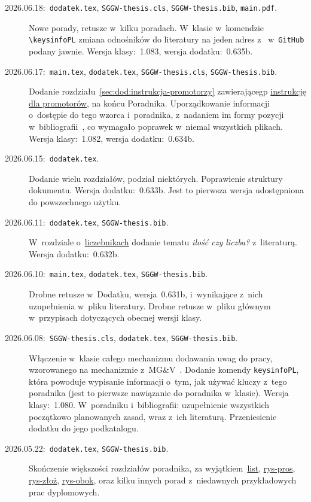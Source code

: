 \begin{description}
\item[\rm 2026.06.18:~{\tt dodatek.tex}, {\tt SGGW-thesis.cls}, {\tt SGGW-thesis.bib}, {\tt main.pdf}.] \mbox{}\linebreak Nowe porady, retusze w~kilku poradach. W~klasie w~komendzie \verb+\keysinfoPL+ zmiana odnośników do literatury na jeden adres z~ w~{\tt GitHub} podany jawnie. Wersja klasy:~1.083, wersja dodatku:~0.635b.
\item[\rm 2026.06.17:~{\tt main.tex}, {\tt dodatek.tex}, {\tt SGGW-thesis.cls}, {\tt SGGW-thesis.bib}.] \mbox{}\linebreak Dodanie rozdziału~\ref{sec:dod:instrukcja-promotorzy} zawierającegp \hyperref[sec:dod:instrukcja-promotorzy]{instrukcję dla promotorów}, na końcu Poradnika. Uporządkowanie informacji o~dostępie do tego wzorca i~poradnika, z~nadaniem im formy pozycji w~bibliografii~, co wymagało poprawek w~niemal wszystkich plikach. Wersja klasy:~1.082, wersja dodatku:~0.634b.
\item[\rm 2026.06.15:~{\tt dodatek.tex}.] Dodanie wielu rozdziałów, podział niektórych. Poprawienie struktury dokumentu. Wersja dodatku:~0.633b. Jest to pierwsza wersja udostępniona do powszechnego użytku.
\item[\rm 2026.06.11:~{\tt dodatek.tex}, {\tt SGGW-thesis.bib}.] W~rozdziale o~\hyperref[sec:dod:liczebniki]{liczebnikach} dodanie tematu {\em ilość czy liczba?} z~literaturą. Wersja dodatku:~0.632b. 
\item[\rm 2026.06.10:~{\tt main.tex}, {\tt dodatek.tex}, {\tt SGGW-thesis.bib}.] Drobne retusze w~Dodatku, wersja~0.631b, i~wynikające z~nich uzupełnienia w~pliku literatury. Drobne retusze w~pliku głównym w~przypisach dotyczących obecnej wersji klasy. 
\item[\rm 2026.06.08:~{\tt SGGW-thesis.cls}, {\tt dodatek.tex}, {\tt SGGW-thesis.bib}.] Włączenie w~klasie całego mechanizmu dodawania uwag do pracy, wzorowanego na mechanizmie z~MG\&V~. Dodanie komendy {\tt \bs{}keysinfoPL}, która powoduje wypisanie informacji o~tym, jak używać kluczy z~tego poradnika (jest to pierwsze nawiązanie do poradnika w~klasie). Wersja klasy:~1.080. W~poradniku i~bibliografii: uzupełnienie wszystkich początkowo planowanych zasad, wraz z~ich literaturą. Przeniesienie dodatku do jego podkatalogu.
\item[\rm 2026.05.22:~{\tt dodatek.tex}, {\tt SGGW-thesis.bib}.] Skończenie większości rozdziałów poradnika, za wyjątkiem~\hyperref[sec:dod:listy]{list}, \hyperref[sec:dod:rysunekzpodrysprosty]{rys-pros}, \hyperref[sec:dod:rysunekzpodryszlozony]{rys-złoż}, \hyperref[sec:dod:rysunekobok]{rys-obok}, oraz kilku innych porad z~niedawnych przykładowych prac dyplomowych.

\end{description}
